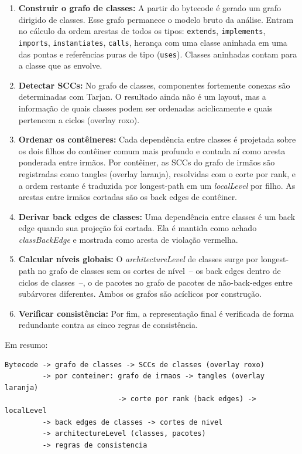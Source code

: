 \documentclass[a4paper,11pt]{article}
\begin{document}
\begin{enumerate}
  \item \textbf{Construir o grafo de classes:} A partir do bytecode \'e gerado
        um grafo dirigido de classes. Esse grafo permanece o modelo bruto da
        an\'alise. Entram no c\'alculo da ordem arestas de todos os tipos:
        \texttt{extends}, \texttt{implements}, \texttt{imports},
        \texttt{instantiates}, \texttt{calls}, heran\c{c}a com uma classe
        aninhada em uma das pontas e refer\^encias puras de tipo
        (\texttt{uses}). Classes aninhadas contam para a classe que as envolve.
  \item \textbf{Detectar SCCs:} No grafo de classes, componentes fortemente
        conexas s\~ao determinadas com Tarjan. O resultado ainda n\~ao \'e um
        layout, mas a informa\c{c}\~ao de quais classes podem ser ordenadas
        aciclicamente e quais pertencem a ciclos (overlay roxo).
  \item \textbf{Ordenar os cont\^eineres:} Cada depend\^encia entre classes \'e
        projetada sobre os dois filhos do cont\^einer comum mais profundo e
        contada a\'i como aresta ponderada entre irm\~aos. Por cont\^einer, as
        SCCs do grafo de irm\~aos s\~ao registradas como tangles (overlay
        laranja), resolvidas com o corte por rank, e a ordem restante \'e
        traduzida por longest-path em um \emph{localLevel} por filho. As
        arestas entre irm\~aos cortadas s\~ao os back edges de cont\^einer.
  \item \textbf{Derivar back edges de classes:} Uma depend\^encia entre classes
        \'e um back edge quando sua proje\c{c}\~ao foi cortada. Ela \'e mantida
        como achado \emph{classBackEdge} e mostrada como aresta de
        viola\c{c}\~ao vermelha.
  \item \textbf{Calcular n\'iveis globais:} O \emph{architectureLevel} de
        classes surge por longest-path no grafo de classes sem os cortes de
        n\'ivel~-- os back edges dentro de ciclos de classes~--, o de pacotes
        no grafo de pacotes de n\~ao-back-edges entre sub\'arvores diferentes.
        Ambos os grafos s\~ao ac\'iclicos por constru\c{c}\~ao.
  \item \textbf{Verificar consist\^encia:} Por fim, a representa\c{c}\~ao final
        \'e verificada de forma redundante contra as cinco regras de
        consist\^encia.
\end{enumerate}

Em resumo:

\begin{lstlisting}
Bytecode -> grafo de classes -> SCCs de classes (overlay roxo)
         -> por conteiner: grafo de irmaos -> tangles (overlay laranja)
                           -> corte por rank (back edges) -> localLevel
         -> back edges de classes -> cortes de nivel
         -> architectureLevel (classes, pacotes)
         -> regras de consistencia
\end{lstlisting}
\end{document}
